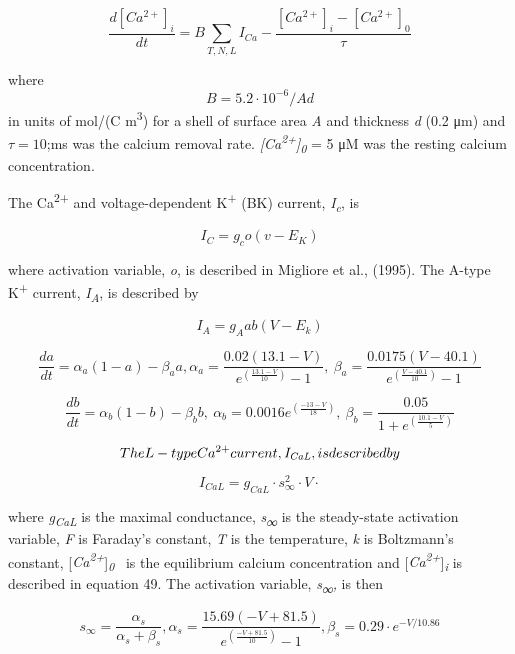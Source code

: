 \documentclass[a4paper]{article}
\begin{document}
\begin{equation}
 \frac{d[Ca^{2+}]_i}{dt}=B\sum_{T, N, L}
I_{Ca}-\frac{[Ca^{2+}]_i-[Ca^{2+}]_0}{\tau}
\end{equation}

where
\begin{equation}
B = 5.2\cdot 10^{-6}/Ad
\end{equation}
in units of mol/(C m\textsuperscript{3}) for a shell of
surface area \textit{A} and thickness \textit{d} (0.2 μm) and  $τ=10$;ms was the calcium removal rate. \textit{[Ca}\textit{\textsuperscript{2+}}\textit{]}\textit{\textsubscript{0}} = 5 μM was the resting calcium concentration. 


The Ca\textsuperscript{2+} and voltage-dependent K\textsuperscript{+} (BK) current,
\textit{I}\textit{\textsubscript{c}}, is 


\begin{equation}
I_C=g_co(v-E_K)
\end{equation}


where activation variable, \textit{o}, is described in Migliore et al., (1995). The A-type K\textsuperscript{+} current,
\textit{I}\textit{\textsubscript{A}}, is described by\ \ 


\begin{equation}
I_A=g_A ab (V-E_k)
\end{equation}

\begin{equation}
\frac{da}{dt}=α_a(1-a)-β_aa , 
α_a=\frac{0.02(13.1-V)}{e^{(\frac{13.1-V}{10})}-1}, \ 
β_a=\frac{0.0175(V-40.1)}{e^{(\frac{V-40.1}{10})}-1}
\end{equation}

\begin{equation}
\frac{db}{dt}=α_b(1-b)-β_bb , \ 
α_b=0.0016e^{(\frac{-13-V}{18})}, \  β_b=\frac{0.05}{1+e^{(\frac{10.1-V} 5)}}
\end{equation}

\begin{equation}
The L-type Ca\textsuperscript{2+} current, \textit{I}\textit{\textsubscript{CaL}}, is described by
\end{equation}

\begin{equation}
I_{CaL}=g_{CaL}\cdot s_{\infty }^2\cdot V\cdot
\end{equation}


where \textit{g}\textit{\textsubscript{CaL}} is the maximal conductance, \textit{s}\textsf{\textit{\textsubscript{∞}}}
is the steady-state activation variable, \textit{F} is Faraday’s constant, \textit{T} is the temperature, \textit{k} is
Boltzmann’s constant, [\textit{Ca\textsuperscript{2+}}]\textit{\textsubscript{0}} \ is the
equilibrium calcium concentration and [\textit{Ca}\textit{\textsuperscript{2+}}]\textit{\textsubscript{i}} is
described in equation 49. The activation variable, \textit{s}\textsf{\textit{\textsubscript{∞}}}\textit{,} is then


\begin{equation}
s_{\infty }=\frac{α_s}{α_s+β_s} ,  α_s=\frac{15.69(-V+81.5)}{e^{(\frac{-V+81.5}{10})}-1} ,  
β_s=0.29\cdot e^{-V/10.86}
\end{equation}


\bigskip
\end{document}
